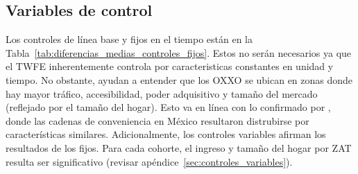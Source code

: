 \documentclass{article}
\begin{document}
\subsection{Variables de control}

Los controles de línea base y fijos en el tiempo están en la Tabla~\ref{tab:diferencias_medias_controles_fijos}. Estos no serán necesarios ya que el TWFE inherentemente controla por caracteristicas constantes en unidad y tiempo. No obstante, ayudan a entender que los OXXO se ubican en zonas donde hay mayor tráfico, accesibilidad, poder adquisitivo y tamaño del mercado (reflejado por el tamaño del hogar). Esto va en línea con lo confirmado por \textcite{marcos2022}, donde las cadenas de conveniencia en México resultaron distrubirse por características similares.  Adicionalmente, los controles variables afirman los resultados de los fijos. Para cada cohorte, el ingreso y tamaño del hogar por ZAT resulta ser significativo (revisar apéndice~\ref{sec:controles_variables}). \\
\end{document}

